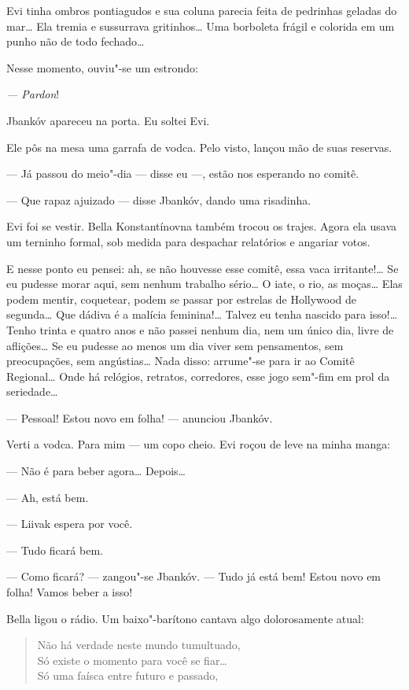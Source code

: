 Evi tinha ombros pontiagudos e sua coluna parecia feita de pedrinhas
geladas do mar\ldots{} Ela tremia e sussurrava gritinhos\ldots{} Uma borboleta
frágil e colorida em um punho não de todo fechado\ldots{}

Nesse momento, ouviu"-se um estrondo:

\emph{--- Pardon}!

Jbankóv apareceu na porta. Eu soltei Evi.

Ele pôs na mesa uma garrafa de vodca. Pelo visto, lançou mão de suas
reservas.

--- Já passou do meio"-dia --- disse eu ---, estão
nos esperando no comitê.

--- Que rapaz ajuizado --- disse Jbankóv, dando uma
risadinha.

Evi foi se vestir. Bella Konstantínovna também trocou os trajes. Agora
ela usava um terninho formal, sob medida para despachar relatórios e
angariar votos.

E nesse ponto eu pensei: ah, se não houvesse esse comitê, essa vaca
irritante!\ldots{} Se eu pudesse morar aqui, sem nenhum trabalho sério\ldots{} O
iate, o rio, as moças\ldots{} Elas podem mentir, coquetear, podem se passar
por estrelas de Hollywood de segunda\ldots{} Que dádiva é a malícia
feminina!\ldots{} Talvez eu tenha nascido para isso!\ldots{} Tenho trinta e quatro
anos e não passei nenhum dia, nem um único dia, livre de aflições\ldots{} Se
eu pudesse ao menos um dia viver sem pensamentos, sem preocupações, sem
angústias\ldots{} Nada disso: arrume"-se para ir ao Comitê Regional\ldots{} Onde há
relógios, retratos, corredores, esse jogo sem"-fim em prol da
seriedade\ldots{}

--- Pessoal! Estou novo em folha! --- anunciou Jbankóv.

Verti a vodca. Para mim --- um copo cheio. Evi roçou de leve na
minha manga:

--- Não é para beber agora\ldots{} Depois\ldots{}

--- Ah, está bem.

--- Liivak espera por você.

--- Tudo ficará bem.

--- Como ficará? --- zangou"-se Jbankóv. --- Tudo já
está bem! Estou novo em folha! Vamos beber a isso!

Bella ligou o rádio. Um baixo"-barítono cantava algo dolorosamente atual:

\begin{verse}
Não há verdade neste mundo tumultuado,\\
Só existe o momento para você se fiar\ldots{}\\
Só uma faísca entre futuro e passado,
\end{verse}

